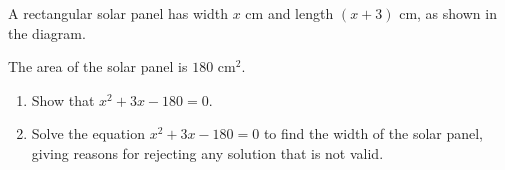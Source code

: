 \begin{question}
\noindent A rectangular solar panel has width $x$ cm and length $(x + 3)$ cm, as shown in the diagram.

\begin{center}
\end{center}

\noindent The area of the solar panel is $180 \text{ cm}^2$.

\begin{enumerate}
    \item[(a)] Show that $x^2 + 3x - 180 = 0$.
    \vspace{3cm}

    \item[(b)] Solve the equation $x^2 + 3x - 180 = 0$ to find the width of the solar panel, giving reasons for rejecting any solution that is not valid.
    \vspace{5cm}
\end{enumerate}
\end{question}
